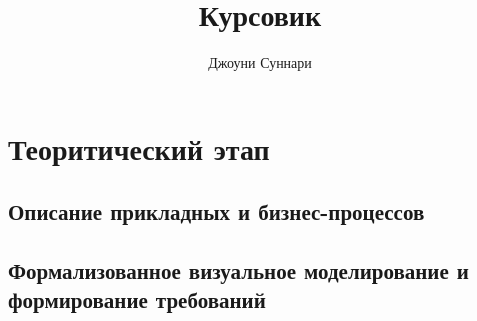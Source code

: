 \documentclass{article}
\author{Джоуни Суннари}
\title{Курсовик}
\begin{document}
\maketitle{}

\tableofcontents{}

\section{Теоритический этап}

\subsection{Описание прикладных и бизнес-процессов}

\subsection{Формализованное визуальное моделирование и формирование требований}
\end{document}
